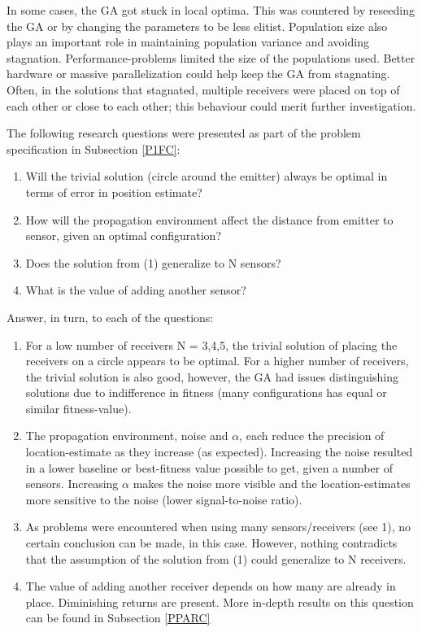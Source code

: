 \documentclass[10pt,a4paper]{book}
\begin{document}
In some cases, the \gls{GA} got stuck in local optima. This was countered by reseeding the \gls{GA} or by changing the parameters to be less elitist. Population size also plays an important role in maintaining population variance and avoiding stagnation. Performance-problems limited the size of the populations used. Better hardware or massive parallelization could help keep the \gls{GA} from stagnating. Often, in the solutions that stagnated, multiple receivers were placed on top of each other or close to each other; this behaviour could merit further investigation. 

The following research questions were presented as part of the problem specification in Subsection \ref{P1FC}:

\begin{enumerate}
\item Will the trivial solution (circle around the emitter) always be optimal in terms of error in position estimate?
\item How will the propagation environment affect the distance from emitter to sensor, given an optimal configuration?
\item Does the solution from (1) generalize to N sensors?
\item What is the value of adding another sensor?
\end{enumerate}

Answer, in turn, to each of the questions:

\begin{enumerate}
\item For a low number of receivers N = 3,4,5, the trivial solution of placing the receivers on a circle appears to be optimal. For a higher number of receivers, the trivial solution is also good, however, the \gls{GA} had issues distinguishing solutions due to indifference in fitness (many configurations has equal or similar fitness-value).

\item The propagation environment, noise and $\alpha$, each reduce the precision of location-estimate as they increase (as expected). Increasing the noise resulted in a lower baseline or best-fitness value possible to get, given a number of sensors. Increasing $\alpha$ makes the noise more visible and the location-estimates more sensitive to the noise (lower signal-to-noise ratio).

\item As problems were encountered when using many sensors/receivers (see 1), no certain conclusion can be made, in this case. However, nothing contradicts that the assumption of the solution from (1) could generalize to N receivers.

\item The value of adding another receiver depends on how many are already in place. Diminishing returns are present. More in-depth results on this question can be found in Subsection \ref{PPARC}
\end{enumerate}
\end{document}
